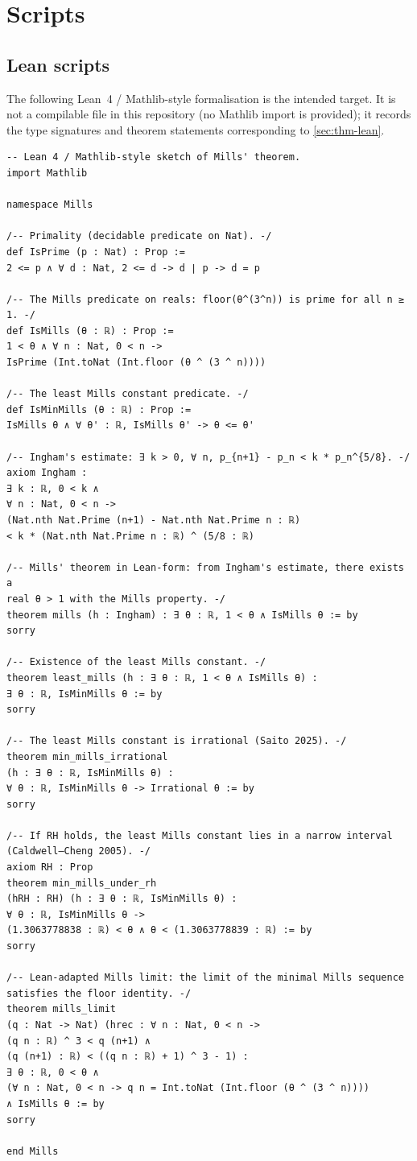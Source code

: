 \documentclass[11pt,reqno]{amsart}
\theoremstyle{blueplain}
\newcounter{type}
\numberwithin{equation}{section}
\begin{document}
\section{Scripts}
\label{sec:scripts}

\subsection{Lean scripts}
\label{sec:scripts-lean}

The following Lean~4 / Mathlib-style formalisation is the intended target.
It is not a compilable file in this repository (no Mathlib import is
provided); it records the type signatures and theorem statements
corresponding to \cref{sec:thm-lean}.

\begin{lstlisting}[style=lean]
-- Lean 4 / Mathlib-style sketch of Mills' theorem.
import Mathlib

namespace Mills

/-- Primality (decidable predicate on Nat). -/
def IsPrime (p : Nat) : Prop :=
2 <= p ∧ ∀ d : Nat, 2 <= d -> d ∣ p -> d = p

/-- The Mills predicate on reals: floor(θ^(3^n)) is prime for all n ≥ 1. -/
def IsMills (θ : ℝ) : Prop :=
1 < θ ∧ ∀ n : Nat, 0 < n ->
IsPrime (Int.toNat (Int.floor (θ ^ (3 ^ n))))

/-- The least Mills constant predicate. -/
def IsMinMills (θ : ℝ) : Prop :=
IsMills θ ∧ ∀ θ' : ℝ, IsMills θ' -> θ <= θ'

/-- Ingham's estimate: ∃ k > 0, ∀ n, p_{n+1} - p_n < k * p_n^{5/8}. -/
axiom Ingham :
∃ k : ℝ, 0 < k ∧
∀ n : Nat, 0 < n ->
(Nat.nth Nat.Prime (n+1) - Nat.nth Nat.Prime n : ℝ)
< k * (Nat.nth Nat.Prime n : ℝ) ^ (5/8 : ℝ)

/-- Mills' theorem in Lean-form: from Ingham's estimate, there exists a
real θ > 1 with the Mills property. -/
theorem mills (h : Ingham) : ∃ θ : ℝ, 1 < θ ∧ IsMills θ := by
sorry

/-- Existence of the least Mills constant. -/
theorem least_mills (h : ∃ θ : ℝ, 1 < θ ∧ IsMills θ) :
∃ θ : ℝ, IsMinMills θ := by
sorry

/-- The least Mills constant is irrational (Saito 2025). -/
theorem min_mills_irrational
(h : ∃ θ : ℝ, IsMinMills θ) :
∀ θ : ℝ, IsMinMills θ -> Irrational θ := by
sorry

/-- If RH holds, the least Mills constant lies in a narrow interval
(Caldwell–Cheng 2005). -/
axiom RH : Prop
theorem min_mills_under_rh
(hRH : RH) (h : ∃ θ : ℝ, IsMinMills θ) :
∀ θ : ℝ, IsMinMills θ ->
(1.3063778838 : ℝ) < θ ∧ θ < (1.3063778839 : ℝ) := by
sorry

/-- Lean-adapted Mills limit: the limit of the minimal Mills sequence
satisfies the floor identity. -/
theorem mills_limit
(q : Nat -> Nat) (hrec : ∀ n : Nat, 0 < n ->
(q n : ℝ) ^ 3 < q (n+1) ∧
(q (n+1) : ℝ) < ((q n : ℝ) + 1) ^ 3 - 1) :
∃ θ : ℝ, 0 < θ ∧
(∀ n : Nat, 0 < n -> q n = Int.toNat (Int.floor (θ ^ (3 ^ n))))
∧ IsMills θ := by
sorry

end Mills
\end{lstlisting}
\end{document}
